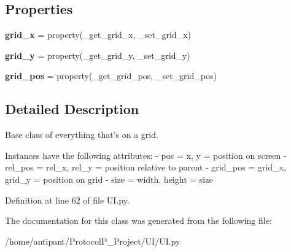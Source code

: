 \subsection*{Properties}
\begin{DoxyCompactItemize}
\item 
\hypertarget{classUI_1_1UIGridObject_a1f2a8d84439799685b761a30c5816ac1}{{\bfseries grid\-\_\-x} = property(\-\_\-get\-\_\-grid\-\_\-x, \-\_\-set\-\_\-grid\-\_\-x)}\label{classUI_1_1UIGridObject_a1f2a8d84439799685b761a30c5816ac1}

\item 
\hypertarget{classUI_1_1UIGridObject_a2aad24251d1eda51b9ad202998c435c7}{{\bfseries grid\-\_\-y} = property(\-\_\-get\-\_\-grid\-\_\-y, \-\_\-set\-\_\-grid\-\_\-y)}\label{classUI_1_1UIGridObject_a2aad24251d1eda51b9ad202998c435c7}

\item 
\hypertarget{classUI_1_1UIGridObject_aa17c84259775d825baaf5c504f6d14f3}{{\bfseries grid\-\_\-pos} = property(\-\_\-get\-\_\-grid\-\_\-pos, \-\_\-set\-\_\-grid\-\_\-pos)}\label{classUI_1_1UIGridObject_aa17c84259775d825baaf5c504f6d14f3}

\end{DoxyCompactItemize}


\subsection{Detailed Description}
\begin{DoxyVerb}Base class of everything that's on a grid.

Instances have the following attributes:
- pos      = x, y           = position on screen
- rel_pos  = rel_x, rel_y   = position relative to parent
- grid_pos = grid_x, grid_y = position on grid
- size     = width, height  = size
\end{DoxyVerb}
 

Definition at line 62 of file U\-I.\-py.



The documentation for this class was generated from the following file\-:\begin{DoxyCompactItemize}
\item 
/home/antipant/\-Protocol\-P\-\_\-\-Project/\-U\-I/U\-I.\-py\end{DoxyCompactItemize}
